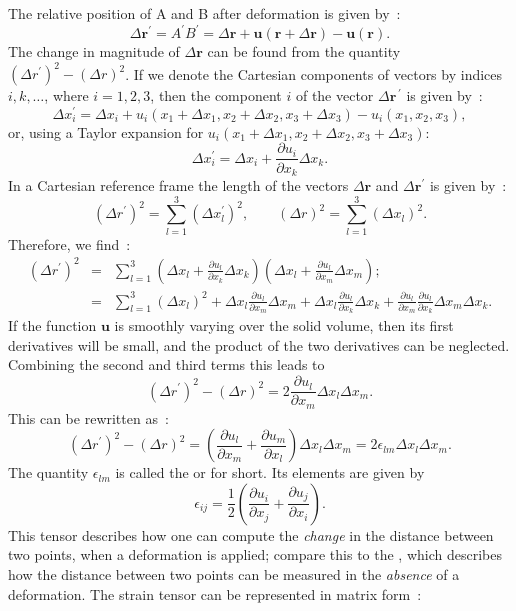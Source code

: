 The relative position of A and B after deformation is given by~:
\[
\Delta\mathbf{r}^{\prime}=A^{\prime}B^{\prime}=\Delta\mathbf{r}+\mathbf{u}(\mathbf{r}+\Delta\mathbf{r})-\mathbf{u}(\mathbf{r}).
\]
The change in magnitude of $\Delta\mathbf{r}$ can be found from the quantity $(\Delta r^{\prime})^2-(\Delta r)^2$. If we denote the Cartesian components of vectors by indices $i,k,\ldots$, where $i=1,2,3$, then the component $i$ of the vector $\Delta\mathbf{r}^{\,\prime}$ is given by~:
\[
\Delta x_i^{\prime}=\Delta x_i+u_i(x_1+\Delta x_1,x_2+\Delta x_2,x_3+\Delta x_3)-u_i(x_1,x_2,x_3),
\]
or, using a Taylor expansion for $u_i(x_1+\Delta x_1,x_2+\Delta x_2,x_3+\Delta x_3)$:
\[
\Delta x_i^{\prime}=\Delta x_i+\frac{\partial u_i}{\partial x_k}\Delta x_k.
\]
In a Cartesian reference frame the length of the vectors $\Delta\mathbf{r}$ and $\Delta\mathbf{r}^{\prime}$ is given by~:
\[
(\Delta r^{\prime})^2=\sum_{l=1}^{3}(\Delta x^{\prime}_l)^2,\qquad (\Delta r)^2=\sum_{l=1}^{3}(\Delta x_l)^2.
\]
Therefore, we find~:
\begin{eqnarray}
(\Delta r^{\prime})^2&=&\sum_{l=1}^{3}\left(\Delta x_l+\frac{\partial u_l}{\partial x_k}\Delta x_k
\right)\left(\Delta x_l+\frac{\partial u_l}{\partial x_m}\Delta x_m\right);\nonumber\\
&=&\sum_{l=1}^{3}(\Delta x_l)^2
+\Delta x_l\frac{\partial u_l}{\partial x_m}\Delta x_m+\Delta x_l\frac{\partial u_l}{\partial x_k}\Delta x_k
+\frac{\partial u_l}{\partial x_m}\frac{\partial u_l}{\partial x_k}\Delta x_m\Delta x_k.\nonumber
\end{eqnarray}
If the function $\mathbf{u}$ is smoothly varying over the solid volume, then its first derivatives will be small, and the product of the two derivatives can be neglected. Combining the second and third terms this leads to
\[
	(\Delta r^{\prime})^2-(\Delta r)^2=2\frac{\partial u_l}{\partial x_m}\Delta x_l\Delta x_m.
\]
This can be rewritten as~:
\[
(\Delta r^{\prime})^2-(\Delta r)^2=\left(\frac{\partial u_l}{\partial x_m}
+\frac{\partial u_m}{\partial x_l}\right)\Delta x_l\Delta x_m=
2\epsilon_{lm}\Delta x_l\Delta x_m.
\]
The quantity $\epsilon_{lm}$ is called the  or  for short.  Its elements are given by
\[
\epsilon_{ij}=\frac{1}{2}\left(\frac{\partial u_i}{\partial x_j}+\frac{\partial u_j}{\partial x_i}\right).
\]
This tensor describes how one can compute the \textit{change} in the distance between two points, when a deformation is applied; compare this to the , which describes how the distance between two points can be measured in the \textit{absence} of a deformation. The strain tensor can be represented in matrix form~:
